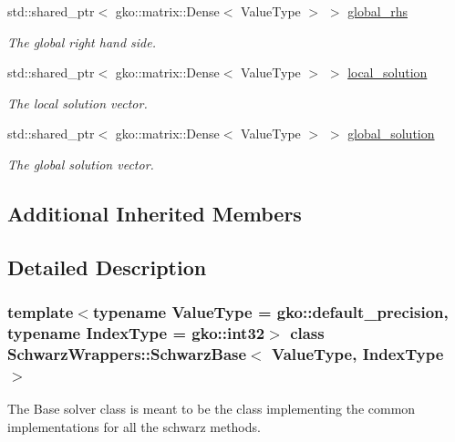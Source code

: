 \begin{DoxyCompactItemize}
std\+::shared\+\_\+ptr$<$ gko\+::matrix\+::\+Dense$<$ Value\+Type $>$ $>$ \hyperlink{classSchwarzWrappers_1_1SchwarzBase_aa44d6d84a22c165ac30a61e47a126465}{global\+\_\+rhs}
\begin{DoxyCompactList}\small\item\em The global right hand side. \end{DoxyCompactList}\item 
\mbox{\label{classSchwarzWrappers_1_1SchwarzBase_aa7acfcc9c34eeebc9727e00b62450c8e}} 
std\+::shared\+\_\+ptr$<$ gko\+::matrix\+::\+Dense$<$ Value\+Type $>$ $>$ \hyperlink{classSchwarzWrappers_1_1SchwarzBase_aa7acfcc9c34eeebc9727e00b62450c8e}{local\+\_\+solution}
\begin{DoxyCompactList}\small\item\em The local solution vector. \end{DoxyCompactList}\item 
\mbox{\label{classSchwarzWrappers_1_1SchwarzBase_a0c7d2f1b2a97968bd662ba3cbac800f6}} 
std\+::shared\+\_\+ptr$<$ gko\+::matrix\+::\+Dense$<$ Value\+Type $>$ $>$ \hyperlink{classSchwarzWrappers_1_1SchwarzBase_a0c7d2f1b2a97968bd662ba3cbac800f6}{global\+\_\+solution}
\begin{DoxyCompactList}\small\item\em The global solution vector. \end{DoxyCompactList}\end{DoxyCompactItemize}
\subsection*{Additional Inherited Members}


\subsection{Detailed Description}
\subsubsection*{template$<$typename Value\+Type = gko\+::default\+\_\+precision, typename Index\+Type = gko\+::int32$>$\newline
class Schwarz\+Wrappers\+::\+Schwarz\+Base$<$ Value\+Type, Index\+Type $>$}

The Base solver class is meant to be the class implementing the common implementations for all the schwarz methods. 

